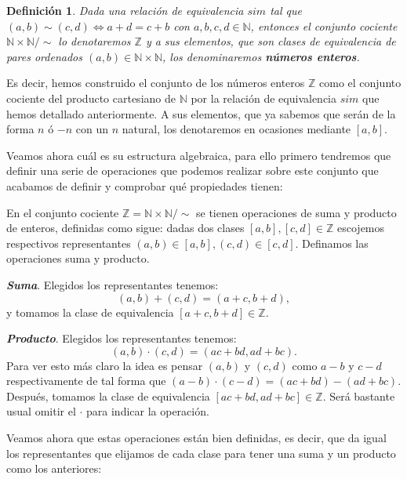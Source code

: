 \documentclass[12pt]{article}
\newtheorem{definition}[theorem]{Definición}
\begin{document}
\begin{definition}Dada una relación de equivalencia $sim$ tal que $(a,b) \sim (c,d) \Leftrightarrow a+d = c+b$ con $a,b,c,d \in \mathbb{N}$, entonces el conjunto cociente $\mathbb{N} \times \mathbb{N}/\sim$ lo denotaremos $\mathbb{Z}$ y a sus elementos, que son clases de equivalencia de pares ordenados $(a,b) \in \mathbb{N} \times \mathbb{N}$, los denominaremos \textbf{números enteros}.
\end{definition}

Es decir, hemos construido el conjunto de los números enteros $\mathbb{Z}$ como el conjunto cociente del producto cartesiano de $\mathbb{N}$ por la relación de equivalencia $sim$ que hemos detallado anteriormente. A sus elementos, que ya sabemos que serán de la forma $n$ ó $-n$ con un $n$ natural, los denotaremos en ocasiones mediante $[a,b]$.

Veamos ahora cuál es su estructura algebraica, para ello primero tendremos que definir una serie de operaciones que podemos realizar sobre este conjunto que acabamos de definir y comprobar qué propiedades tienen: 

En el conjunto cociente $\mathbb{Z} = \mathbb{N} \times \mathbb{N}/\sim$ se tienen operaciones de suma y producto de enteros, definidas como sigue: dadas dos clases $[a,b],[c,d] \in \mathbb{Z}$ escojemos respectivos representantes $(a,b)\in [a,b], (c,d) \in [c,d]$. Definamos las operaciones suma y producto.

\textbf{\textit{Suma}}. Elegidos los representantes tenemos: $$(a,b)+(c,d) = (a+c,b+d),$$ y tomamos la clase de equivalencia $[a+c, b+d] \in \mathbb{Z}$.

\textbf{\textit{Producto}}. Elegidos los representantes tenemos: $$(a,b)\cdot(c,d)=(ac+bd,ad+bc).$$ Para ver esto más claro la idea es pensar $(a,b)$ y $(c,d)$ como $a-b$ y $c-d$ respectivamente de tal forma que $(a-b)\cdot(c-d)= (ac+bd) - (ad+bc)$. Después, tomamos la clase de equivalencia $[ac+bd, ad + bc]\in \mathbb{Z}$. Será bastante usual omitir el $\cdot$ para indicar la operación.

Veamos ahora que estas operaciones están bien definidas, es decir, que da igual los representantes que elijamos de cada clase para tener una suma y un producto como los anteriores:
\end{document}
